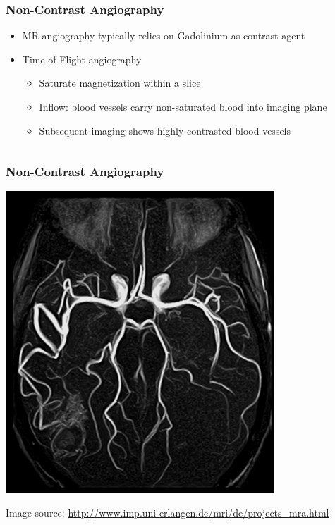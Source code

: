 \begin{frame}
	\frametitle{Non-Contrast Angiography}
	
	\begin{itemize}
		\item MR angiography typically relies on Gadolinium as contrast agent
		\item Time-of-Flight angiography
		\begin{itemize}
			\item Saturate magnetization within a slice
			\item Inflow: blood vessels carry non-saturated blood into imaging plane
			\item Subsequent imaging shows highly contrasted blood vessels
		\end{itemize}
	\end{itemize}
	
	\begin{columns}[onlytextwidth,c]
		\begin{center}
			\begingroup
			
			\endgroup
		\end{center}
		
		\begin{center}
			\begingroup
			
			\endgroup
		\end{center}
	\end{columns}
\end{frame}

\begin{frame}
	\frametitle{Non-Contrast Angiography}
	
	\begin{center}
		\includegraphics[height=0.8\textheight]{images/mra_head}
	\end{center}
	
	\flushright
	\tiny Image source: \url{http://www.imp.uni-erlangen.de/mri/de/projects_mra.html}
\end{frame}

